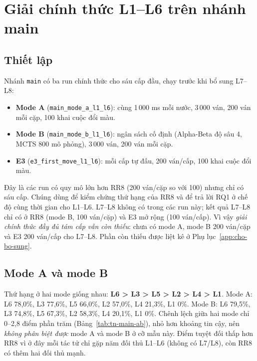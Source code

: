 \section{Giải chính thức L1--L6 trên nhánh main}
\label{sec:tn-main}
\subsection{Thiết lập}
Nhánh \texttt{main} có ba run chính thức cho sáu cấp đầu, chạy trước khi bổ sung L7--L8:
\begin{itemize}
  \item \textbf{Mode A} (\texttt{main\_mode\_a\_l1\_l6}): cùng 1\,000 ms mỗi nước, 3\,000 ván,
        200 ván mỗi cặp, 100 khai cuộc đổi màu.
  \item \textbf{Mode B} (\texttt{main\_mode\_b\_l1\_l6}): ngân sách cố định (Alpha-Beta độ sâu 4,
        MCTS 800 mô phỏng), 3\,000 ván, 200 ván mỗi cặp.
  \item \textbf{E3} (\texttt{e3\_first\_move\_l1\_l6}): mỗi cấp tự đấu, 200 ván/cấp, 100 khai
        cuộc đổi màu.
\end{itemize}
Đây là các run có quy mô lớn hơn RR8 (200 ván/cặp so với 100) nhưng chỉ có sáu cấp. Chúng dùng
để kiểm chứng thứ hạng của RR8 và để trả lời RQ1 ở chế độ cùng thời gian cho L1--L6. L7--L8
không có trong các run này; kết quả L7--L8 chỉ có ở RR8 (mode B, 100 ván/cặp) và E3 mở rộng
(100 ván/cấp). Vì vậy \emph{giải chính thức đầy đủ tám cấp vẫn còn thiếu}: chưa có mode A,
mode B 200 ván/cặp và E3 200 ván/cấp cho L7--L8. Phần còn thiếu được liệt kê ở
Phụ lục~\ref{app:cho-bo-sung}.

\subsection{Mode A và mode B}
\begin{table}[H]
  \centering\small
  \caption{Mode A (cùng 1\,000 ms/nước): xếp hạng và ma trận điểm phần trăm. Mỗi tác tử 1\,000
  ván; mỗi ô ma trận 200 ván.}
  \label{tab:tn-main-a}
  
\end{table}
\begin{table}[H]
  \centering\small
  \caption{Mode B (ngân sách cố định: Alpha-Beta độ sâu 4, MCTS 800 mô phỏng): xếp hạng và ma
  trận điểm phần trăm. Mỗi tác tử 1\,000 ván; mỗi ô ma trận 200 ván.}
  \label{tab:tn-main-b}
  
\end{table}

Thứ hạng ở hai mode giống nhau: \textbf{L6 > L3 > L5 > L2 > L4 > L1}. Mode A: L6 78,0\%, L3
77,6\%, L5 66,0\%, L2 57,0\%, L4 21,3\%, L1 0\%. Mode B: L6 79,5\%, L3 74,8\%, L5 67,3\%, L2
58,3\%, L4 20,1\%, L1 0\%. Chênh lệch giữa hai mode chỉ 0--2,8 điểm phần trăm (Bảng~\ref{tab:tn-main-ab}),
nhỏ hơn khoảng tin cậy, nên \emph{không phân biệt được} mode A và mode B ở cỡ mẫu này. Điểm
tuyệt đối thấp hơn RR8 vì ở đây mỗi tác tử chỉ gặp năm đối thủ L1--L6 (không có L7/L8), còn RR8
có thêm hai đối thủ mạnh.

